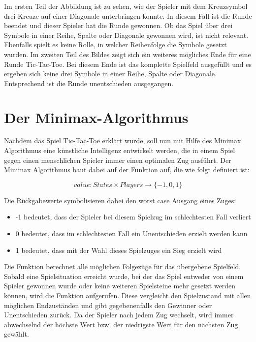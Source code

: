 Im ersten Teil der Abbildung ist zu sehen, wie der Spieler mit dem Kreuzsymbol drei Kreuze auf einer Diagonale unterbringen
konnte. In diesem Fall ist die Runde beendet und dieser Spieler hat die Runde gewonnen. Ob das Spiel über drei Symbole in einer
Reihe, Spalte oder Diagonale gewonnen wird, ist nicht relevant. Ebenfalls spielt es keine Rolle, in welcher Reihenfolge die 
Symbole gesetzt wurden. Im zweiten Teil des Bildes zeigt sich ein weiteres mögliches Ende für eine Runde Tic-Tac-Toe. Bei diesem
Ende ist das komplette Spielfeld ausgefüllt und es ergeben sich keine drei Symbole in einer Reihe, Spalte oder Diagonale. 
Entsprechend ist die Runde unentschieden ausgegangen.

\section{Der Minimax-Algorithmus}
\label{chap:minimax}
Nachdem das Spiel Tic-Tac-Toe erklärt wurde, soll nun mit Hilfe des Minimax Algorithmus eine künstliche Intelligenz 
entwickelt werden, die in einem Spiel gegen einen menschlichen Spieler immer einen optimalen Zug ausführt. Der Minimax 
Algorithmus baut dabei auf der Funktion  auf, die wie folgt definiert ist:

\[value: States \times Players \rightarrow \{-1,0,1\}\]

Die Rückgabewerte symbolisieren dabei den worst case Ausgang eines Zuges:

\begin{itemize}
    \item -1 bedeutet, dass der Spieler bei diesem Spielzug im schlechtesten Fall verliert
    \item 0 bedeutet, dass im schlechtesten Fall ein Unentschieden erzielt werden kann
    \item 1 bedeutet, dass mit der Wahl dieses Spielzuges ein Sieg erzielt wird
\end{itemize}

Die Funktion berechnet alle möglichen Folgezüge für das übergebene Spielfeld. Sobald eine Spielsituation 
erreicht wurde, bei der das Spiel entweder von einem Spieler gewonnen wurde oder keine weiteren Spielsteine 
mehr gesetzt werden können, wird die Funktion  aufgerufen. Diese vergleicht den Spielzustand 
mit allen möglichen Endzuständen und gibt gegebenenfalls den Gewinner oder Unentschieden zurück. Da der Spieler 
nach jedem Zug wechselt, wird immer abwechselnd der höchste Wert bzw. der niedrigste Wert für den nächsten Zug gewählt.\autocite[Vgl.][S. 2]{GlennStrong.2011}

